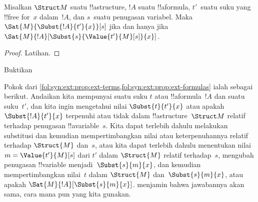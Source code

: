 \documentclass[../../../include/open-logic-section]{subfiles}
\begin{document}
\begin{prop} Misalkan $\Struct M$ suatu
!!a{structure}, $!A$ suatu !!a{formula}, $t'$~suatu suku yang !!{free for}~$x$
dalam~$!A$, dan $s$~suatu
penugasan variabel. Maka $\Sat{M}{\Subst{!A}{t'}{x}}[s]$ jika dan hanya jika
$\Sat{M}{!A}[\Subst{s}{\Value{t'}{M}[s]}{x}]$.
\end{prop}

\begin{proof}
Latihan.
\end{proof}

\begin{prob}
Buktikan 
\end{prob}

\begin{explain}
  Pokok dari
  \cref{fol:syn:ext:prop:ext-terms,fol:syn:ext:prop:ext-formulas} ialah
  sebagai berikut. Andaikan kita mempunyai suatu suku $t$ atau
  !!a{formula}~$!A$ dan suatu suku~$t'$, dan kita ingin mengetahui nilai
  $\Subst{t}{t'}{x}$ atau apakah $\Subst{!A}{t'}{x}$ terpenuhi atau tidak
  dalam !!a{structure}~$\Struct M$ relatif terhadap penugasan
  !!a{variable}~$s$. Kita dapat terlebih dahulu melakukan substitusi dan
  kemudian mempertimbangkan nilai atau keterpenuhannya relatif terhadap
  $\Struct{M}$ dan~$s$, atau kita dapat terlebih dahulu menentukan
  nilai~$m = \Value{t'}{M}[s]$ dari $t'$ dalam $\Struct{M}$ relatif
  terhadap~$s$, mengubah penugasan !!{variable} menjadi~$\Subst{s}{m}{x}$,
  dan kemudian mempertimbangkan nilai~$t$ dalam $\Struct{M}$
  dan~$\Subst{s}{m}{x}$, atau apakah
  $\Sat{M}{!A}[\Subst{s}{m}{x}]$.
  menjamin bahwa jawabannya akan sama, cara mana pun yang kita gunakan.
\end{explain}
\end{document}
